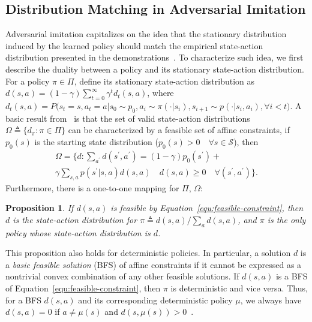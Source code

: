 \documentclass[letterpaper]{article} %
\newtheorem{proposition}{Proposition}
\begin{document}
\subsection{Distribution Matching in Adversarial Imitation}\label{sec:duality}
Adversarial imitation capitalizes on the idea that the stationary distribution induced by the learned policy should match the empirical state-action distribution presented in the demonstrations~\cite{ho2016generative}.
To characterize such idea, we first describe the duality between a policy and its stationary state-action distribution.
For a policy $\pi\in\Pi$, define its stationary state-action distribution as  $d(s, a)=(1-\gamma)\sum_{t=0}^{\infty}\gamma^t d_t(s, a)$,
where $d_t(s, a)=P \big( s_t=s, a_t=a|s_0\sim p_0, a_i\sim\pi(\cdot|s_i), s_{i+1}\sim p(\cdot|s_i, a_i), \forall i<t \big)$.
A basic result from~\citet{puterman2014markov} is that the set of valid state-action distributions $\Omega\triangleq\{d_{\pi}: \pi\in\Pi\}$ can be characterized by a feasible set of affine constraints,
if $p_0(s)$ is the starting state distribution ($p_0(s)>0 \quad \forall s\in\mathcal{S}$), then
\begin{multline}\label{equ:feasible-constraint}
\Omega=\big\{d: \sum_{a^\prime} d(s^\prime, a^\prime) = (1-\gamma) p_0(s^\prime) + \\
\gamma\sum_{s, a}p(s^\prime|s, a)d(s, a) \quad d(s, a)\geq 0 \quad \forall (s^\prime, a^\prime)
\big\}.
\end{multline}
Furthermore, there is a one-to-one mapping for $\Pi$, $\Omega$:
\begin{proposition}\label{prop:one-one-correspondence}
\cite{syed2007game} If $d(s, a)$ is feasible by Equation~\eqref{equ:feasible-constraint}, then $d$ is the state-action distribution for $\pi\triangleq d(s, a)/\sum_{a}d(s, a)$, and $\pi$ is the only policy whose state-action distribution is $d$.
\end{proposition}
This proposition also holds for deterministic policies.
In particular, a solution $d$ is a \emph{basic feasible solution} (BFS) of affine constraints if it cannot be expressed as a nontrivial convex combination of any other feasible solutions.
If $d(s, a)$ is a BFS of Equation~\eqref{equ:feasible-constraint}, then $\pi$ is deterministic and vice versa.
Thus, for a BFS $d(s, a)$ and its corresponding deterministic policy $\mu$, we always have $d(s, a)=0$ if $a\neq\mu(s)$ and $d(s, \mu(s))>0$~\cite{puterman2014markov}.
\end{document}
